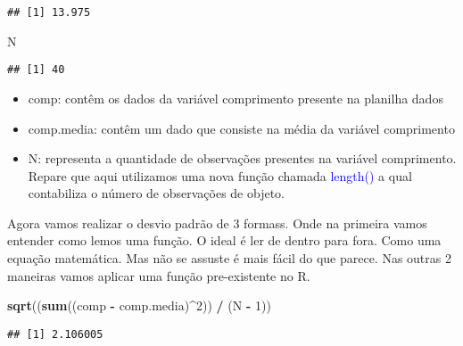 \documentclass[14pt,titlepage, oneside, openany, a4paper]{book}
\newenvironment{Shaded}{\begin{snugshade}}{\end{snugshade}}
\newcommand{\DecValTok}[1]{\textcolor[rgb]{0.00,0.00,0.81}{#1}}
\newcommand{\KeywordTok}[1]{\textcolor[rgb]{0.13,0.29,0.53}{\textbf{#1}}}
\newcommand{\NormalTok}[1]{#1}
\newcommand{\OperatorTok}[1]{\textcolor[rgb]{0.81,0.36,0.00}{\textbf{#1}}}
\newcommand{\StringTok}[1]{\textcolor[rgb]{0.31,0.60,0.02}{#1}}
\providecommand{\tightlist}{%
  \setlength{\itemsep}{0pt}\setlength{\parskip}{0pt}}
\begin{document}
\begin{verbatim}
## [1] 13.975
\end{verbatim}

\begin{Shaded}
\begin{Highlighting}[]
\NormalTok{N}
\end{Highlighting}
\end{Shaded}

\begin{verbatim}
## [1] 40
\end{verbatim}

\begin{itemize}
\tightlist
\item
  comp: contêm os dados da variável comprimento presente na planilha dados
\item
  comp.media: contêm um dado que consiste na média da variável comprimento
\item
  N: representa a quantidade de observações presentes na variável comprimento. Repare que aqui utilizamos uma nova função chamada \textcolor{blue}{length()} a qual contabiliza o número de observações de objeto.
\end{itemize}

Agora vamos realizar o desvio padrão de 3 formass. Onde na primeira vamos entender como lemos uma função. O ideal é ler de dentro para fora. Como uma equação matemática. Mas não se assuste é mais fácil do que parece. Nas outras 2 maneiras vamos aplicar uma função pre-existente no R.

\begin{Shaded}
\begin{Highlighting}[]
\KeywordTok{sqrt}\NormalTok{((}\KeywordTok{sum}\NormalTok{((comp }\OperatorTok{-}\StringTok{ }\NormalTok{comp.media)}\OperatorTok{^}\DecValTok{2}\NormalTok{)) }\OperatorTok{/}\StringTok{ }\NormalTok{(N }\OperatorTok{-}\StringTok{ }\DecValTok{1}\NormalTok{))}
\end{Highlighting}
\end{Shaded}

\begin{verbatim}
## [1] 2.106005
\end{verbatim}

\begin{Shaded}
\end{Shaded}
\end{document}
